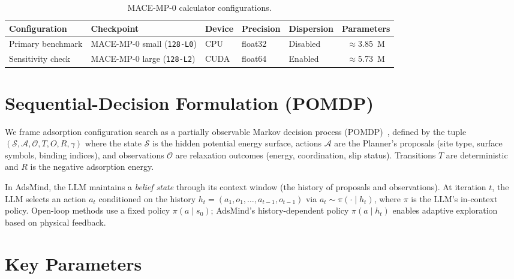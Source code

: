 \documentclass[%
 preprint,
 superscriptaddress,
 amsmath,amssymb,
 aps,
 prb,
 floatfix,
]{revtex4-2}
\begin{document}
\begin{table}[ht]
\centering
\caption{MACE-MP-0 calculator configurations.}
\label{tab:mace_config}
\begin{tabular}{lllllc}
\toprule
Configuration & Checkpoint & Device & Precision & Dispersion & Parameters \\
\midrule
Primary benchmark & MACE-MP-0 small (\texttt{128-L0}) & CPU & float32 & Disabled & $\approx$3.85~M \\
Sensitivity check & MACE-MP-0 large  (\texttt{128-L2}) & CUDA & float64 & Enabled  & $\approx$5.73~M \\
\bottomrule
\end{tabular}
\end{table}



\section{Sequential-Decision Formulation (POMDP)}
\label{sec:si-pomdp}

We frame adsorption configuration search as a partially observable Markov decision process (POMDP)~\cite{kochenderfer2015decision,astrom1965optimal,sutton2018reinforcement}, defined by the tuple $(\mathcal{S}, \mathcal{A}, \mathcal{O}, T, O, R, \gamma)$ where the state $\mathcal{S}$ is the hidden potential energy surface, actions $\mathcal{A}$ are the Planner's proposals (site type, surface symbols, binding indices), and observations $\mathcal{O}$ are relaxation outcomes (energy, coordination, slip status). Transitions $T$ are deterministic and $R$ is the negative adsorption energy.

In AdsMind, the LLM maintains a \textit{belief state} through its context window (the history of proposals and observations). At iteration $t$, the LLM selects an action $a_t$ conditioned on the history $h_t = (a_1, o_1, \dots, a_{t-1}, o_{t-1})$ via $a_t \sim \pi(\cdot \mid h_t)$, where $\pi$ is the LLM's in-context policy. Open-loop methods use a fixed policy $\pi(a \mid s_0)$; AdsMind's history-dependent policy $\pi(a \mid h_t)$ enables adaptive exploration based on physical feedback.



\section{Key Parameters}
\label{sec:si-parameters}
\end{document}
